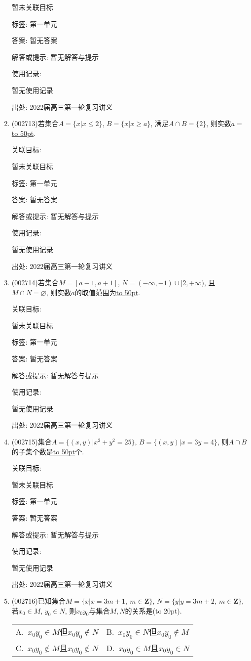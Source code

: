 \documentclass[10pt,a4paper]{article}
\newcommand{\blank}[1]{\underline{\hbox to #1pt{}}}
\newcommand{\bracket}[1]{(\hbox to #1pt{})}
\newcommand{\twoch}[4]{\par\begin{tabular}{p{.46\textwidth}p{.46\textwidth}}
A.~#1& B.~#2\\
C.~#3& D.~#4
\end{tabular}}
\begin{document}
\begin{enumerate}[1.]
暂未关联目标



标签: 第一单元

答案: 暂无答案

解答或提示: 暂无解答与提示

使用记录:

暂无使用记录


出处: 2022届高三第一轮复习讲义
\item { (002713)}若集合$A=\{x|x\le 2\}$, $B=\{x|x\ge a\}$, 满足$A\cap B=\{2\}$, 则实数$a=$\blank{50}.


关联目标:

暂未关联目标



标签: 第一单元

答案: 暂无答案

解答或提示: 暂无解答与提示

使用记录:

暂无使用记录


出处: 2022届高三第一轮复习讲义
\item { (002714)}若集合$M=[a-1,a+1]$, $N=(-\infty,-1)\cup [2,+\infty)$, 且$M\cap N=\varnothing$, 则实数$a$的取值范围为\blank{50}.


关联目标:

暂未关联目标



标签: 第一单元

答案: 暂无答案

解答或提示: 暂无解答与提示

使用记录:

暂无使用记录


出处: 2022届高三第一轮复习讲义
\item { (002715)}集合$A=\{(x,y)|x^2+y^2=25\}$, $B=\{(x,y)|x=3y=4\}$, 则$A\cap B$的子集个数是\blank{50}个.


关联目标:

暂未关联目标



标签: 第一单元

答案: 暂无答案

解答或提示: 暂无解答与提示

使用记录:

暂无使用记录


出处: 2022届高三第一轮复习讲义
\item { (002716)}已知集合$M=\{x|x=3m+1, \ m\in \mathbf{Z}\}$, $N=\{y|y=3m+2, \ m\in \mathbf{Z}\}$, 若$x_0\in M$, $y_0\in N$, 则$x_0y_0$与集合$M,N$的关系是\bracket{20}.
\twoch{$x_0y_0\in M$但$x_0y_0$$\notin N$}{$x_0y_0\in N$但$x_0y_0\notin M$}{$x_0y_0\notin M$且$x_0y_0\notin N$}{$x_0y_0$$\in M$且$x_0y_0\in N$}



\end{enumerate}
\end{document}
